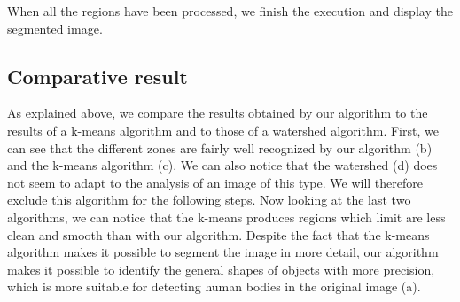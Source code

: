 \documentclass[conference]{IEEEtran}
\begin{document}
When all the regions have been processed, we finish the execution and display the segmented image.


\subsection{Comparative result}

As explained above, we compare the results obtained by our algorithm to the results of a k-means algorithm and to those of a watershed algorithm. First, we can see that the different zones are fairly well recognized by our algorithm (b) and the k-means algorithm (c). We can also notice that the watershed  (d) does not seem to adapt to the analysis of an image of this type. We will therefore exclude this algorithm for the following steps.
Now looking at the last two algorithms, we can notice that the k-means produces regions which limit are less clean and smooth than with our algorithm. Despite the fact that the k-means algorithm makes it possible to segment the image in more detail, our algorithm makes it possible to identify the general shapes of objects with more precision, which is more suitable for detecting human bodies in the original image (a). 
\end{document}
